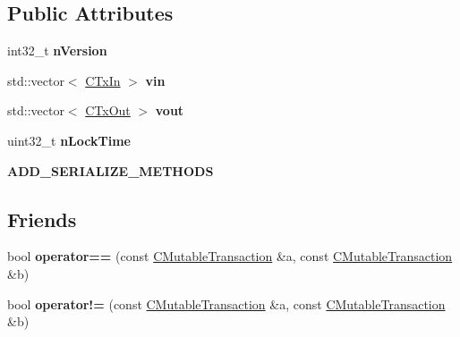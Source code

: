 \subsection*{Public Attributes}
\begin{DoxyCompactItemize}
\item 
\mbox{\label{struct_c_mutable_transaction_a23d7f377dce887f5b37539b0bf51733e}} 
int32\+\_\+t {\bfseries n\+Version}
\item 
\mbox{\label{struct_c_mutable_transaction_ad6b1a0a773293fd153a1d384923631da}} 
std\+::vector$<$ \mbox{\hyperlink{class_c_tx_in}{C\+Tx\+In}} $>$ {\bfseries vin}
\item 
\mbox{\label{struct_c_mutable_transaction_aca14a252c78e4af2dfe68d7ea67a77dc}} 
std\+::vector$<$ \mbox{\hyperlink{class_c_tx_out}{C\+Tx\+Out}} $>$ {\bfseries vout}
\item 
\mbox{\label{struct_c_mutable_transaction_ae9685a37d424cd00e3badda28260c848}} 
uint32\+\_\+t {\bfseries n\+Lock\+Time}
\item 
\mbox{\label{struct_c_mutable_transaction_addcc243750be876ebb36ad4badd8aff8}} 
{\bfseries A\+D\+D\+\_\+\+S\+E\+R\+I\+A\+L\+I\+Z\+E\+\_\+\+M\+E\+T\+H\+O\+DS}
\end{DoxyCompactItemize}
\subsection*{Friends}
\begin{DoxyCompactItemize}
\item 
\mbox{\label{struct_c_mutable_transaction_a5ca3175c47a2ad544682565ce6c07502}} 
bool {\bfseries operator==} (const \mbox{\hyperlink{struct_c_mutable_transaction}{C\+Mutable\+Transaction}} \&a, const \mbox{\hyperlink{struct_c_mutable_transaction}{C\+Mutable\+Transaction}} \&b)
\item 
\mbox{\label{struct_c_mutable_transaction_a472fffdfa068323daec94304dc9fbfc1}} 
bool {\bfseries operator!=} (const \mbox{\hyperlink{struct_c_mutable_transaction}{C\+Mutable\+Transaction}} \&a, const \mbox{\hyperlink{struct_c_mutable_transaction}{C\+Mutable\+Transaction}} \&b)
\end{DoxyCompactItemize}


